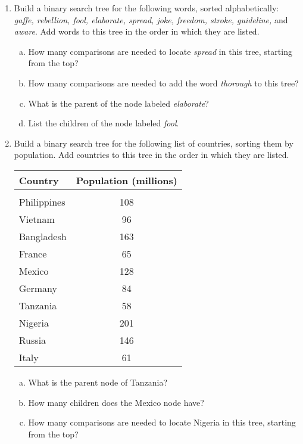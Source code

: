\begin{enumerate}
\item Build a binary search tree for the following words, sorted alphabetically: \emph{gaffe, rebellion, fool, elaborate, spread, joke, freedom, stroke, guideline,} and \emph{aware}.  Add words to this tree in the order in which they are listed.
\begin{enumerate}[(a)]
\item How many comparisons are needed to locate \textit{spread} in this tree, starting from the top? 
\item How many comparisons are needed to add the word \emph{thorough} to this tree? 
\item What is the parent of the node labeled \emph{elaborate}? 
\item List the children of the node labeled \emph{fool}. 
\end{enumerate}
\pagebreak

\item Build a binary search tree for the following list of countries, sorting them by population.  Add countries to this tree in the order in which they are listed.
\begin{center}
\begin{tabular}{l c}
\textbf{Country} & \textbf{Population (millions)}\\
\hline
& \\
Philippines & 108\\
Vietnam & 96\\
Bangladesh & 163\\
France & 65\\
Mexico & 128\\
Germany & 84\\
Tanzania & 58\\
Nigeria & 201\\
Russia & 146\\
Italy & 61
\end{tabular}
\end{center}
\begin{enumerate}[(a)]
\item What is the parent node of Tanzania? 
\item How many children does the Mexico node have? 
\item How many comparisons are needed to locate Nigeria in this tree, starting from the top? 
\end{enumerate}


\end{enumerate}

